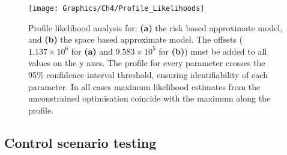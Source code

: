 \begin{figure}
    \begin{center}
        \texttt{[image: Graphics/Ch4/Profile\_Likelihoods]}
        \caption[Profile likelihood analysis for the approximate models]{Profile likelihood analysis for: \textbf{(a)} the risk based approximate model, and \textbf{(b)} the space based approximate model. The offsets ($1.137\times10^6$ for \textbf{(a)} and $9.583\times10^5$ for \textbf{(b)}) must be added to all values on the y axes. The profile for every parameter crosses the 95\% confidence interval threshold, ensuring identifiability of each parameter. In all cases maximum likelihood estimates from the unconstrained optimisation coincide with the maximum along the profile.}
        \label{fig:profile_lik}
    \end{center}
\end{figure}

\FloatBarrier
\subsection{Control scenario testing}

